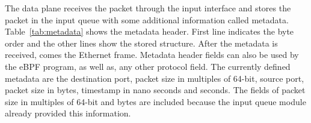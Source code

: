 

The data plane receives the packet through the input interface and stores the packet in the input queue with some additional information called metadata.
Table~\ref{tab:metadata} shows the metadata header. First line indicates the byte order and the other lines show the stored structure.
After the metadata is received, comes the Ethernet frame. Metadata header fields can also be used by the eBPF program, as well as, any other protocol field. The currently defined metadata are the destination port, packet size in multiples of 64-bit, source port, packet size in bytes, timestamp in nano seconds and seconds. The fields of packet size in multiples of 64-bit and bytes are included because the input queue module already provided this information.

